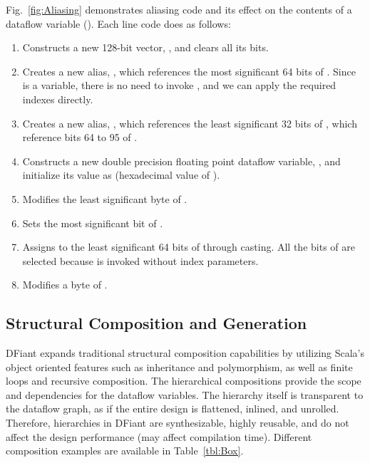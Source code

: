 Fig.~\ref{fig:Aliasing} demonstrates aliasing code and its effect on the contents of a dataflow variable (). Each line code does as follows:
\begin{enumerate}
  \item Constructs a new 128-bit vector, , and clears all its bits.
  \item Creates a new alias, , which references the most significant 64 bits of . Since  is a  variable, there is no need to invoke , and we can apply the required indexes directly.
  \item Creates a new alias, , which references the least significant 32 bits of , which reference bits 64 to 95 of .
  \item Constructs a new double precision floating point dataflow variable, , and initialize its value as  (hexadecimal value of ).
  \item Modifies the least significant byte of .
  \item Sets the most significant bit of .
  \item Assigns  to the least significant 64 bits of  through casting. All the bits of  are selected because  is invoked without index parameters.
  \item Modifies a byte of .
  
\end{enumerate}


\subsection{Structural Composition and Generation}
DFiant expands traditional structural composition capabilities by utilizing Scala's object oriented features such as inheritance and polymorphism, as well as finite loops and recursive composition. The hierarchical compositions provide the scope and dependencies for the dataflow variables. The hierarchy itself is transparent to the dataflow graph, as if the entire design is flattened, inlined, and unrolled. Therefore, hierarchies in DFiant are synthesizable, highly reusable, and do not affect the design performance (may affect compilation time). Different composition examples are available in Table~\ref{tbl:Box}.

